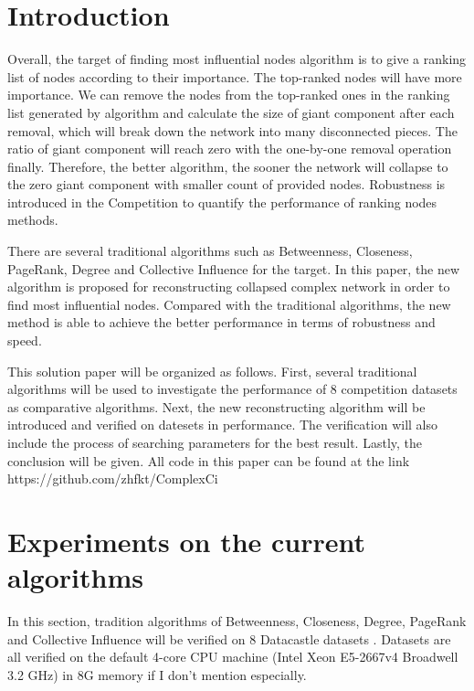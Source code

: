 \documentclass{article}
\begin{document}
	\section{Introduction}


	Overall, the target of finding most influential nodes algorithm is to give a ranking list of nodes according to their importance. The top-ranked nodes will have more importance. We can remove the nodes from the top-ranked ones in the ranking list generated by algorithm and calculate the size of giant component after each removal, which will break down the network into many disconnected pieces. The ratio of giant component will reach zero with the one-by-one removal operation finally. Therefore, the better algorithm, the sooner the network will collapse to the zero giant component with smaller count of provided nodes. Robustness \cite{schneider2011mitigation} is introduced in the Competition to quantify the performance of ranking nodes methods. 
	
	There are several traditional algorithms such as  Betweenness\cite{wikiBetweennesscentrality}, Closeness\cite{wikiClosenesscentrality}, PageRank\cite{wikiPageRank}, Degree\cite{wikiCentrality} and Collective Influence\cite{morone2015influence}\cite{morone2016collective} for the target. In this paper, the new algorithm is proposed for reconstructing collapsed complex network in order to find most influential nodes. Compared with the traditional algorithms, the new method is able to achieve the better performance in terms of robustness and speed. 
	
	This solution paper will be organized as follows. First, several traditional algorithms will be used to investigate the performance of 8 competition datasets as comparative algorithms. Next, the new reconstructing algorithm will be introduced and verified on datesets in performance. The verification will also include the process of searching parameters for the best result. Lastly, the conclusion will be given. All code in this paper can be found at the link https://github.com/zhfkt/ComplexCi \cite{zhfktgithub} \cite{zhfkt2017887989}

	\section{Experiments on the current algorithms}
	
	In this section, tradition algorithms of Betweenness\cite{wikiBetweennesscentrality}, Closeness\cite{wikiClosenesscentrality}, Degree\cite{wikiCentrality}, PageRank\cite{wikiPageRank} and Collective Influence\cite{morone2015influence}\cite{morone2016collective} will be verified on 8 Datacastle datasets . Datasets are all verified on the default 4-core CPU machine (Intel Xeon E5-2667v4 Broadwell 3.2 GHz) in 8G memory if I don't mention especially.
\end{document}
